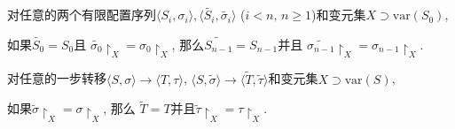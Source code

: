 \documentclass[UTF8]{ctexart}
\begin{document}
对任意的两个有限配置序列$\langle S_i,\sigma_i\rangle,
\langle\widetilde{S_i},\widetilde{\sigma_i}\rangle$
($i<n,\,n\geqslant 1$)和变元集$X\supset\mathrm{var}(S_0)$,

\vspace{1pt}
如果$\widetilde{S_0}=S_0$且
$\widetilde{\sigma_0}\!\restriction_X=\sigma_0\!\restriction_X$,
那么$\widetilde{S_{n-1}}=S_{n-1}$并且
$\widetilde{\sigma_{n-1}}\!\restriction_X=\sigma_{n-1}\!\restriction_X$.


\vspace{1pt}\hspace{-1em}
对任意的一步转移$\langle S,\sigma\rangle\to\langle T,\tau\rangle$,
$\langle S,\widetilde{\sigma}\rangle\to
\langle\widetilde{T},\widetilde{\tau}\rangle$和变元集$X\supset\mathrm{var}(S)$,

\vspace{1pt}\hspace{2.17em}
如果$\widetilde{\sigma}\!\restriction_X=\sigma\!\restriction_X$, 那么
$\widetilde{T}=T$并且$\widetilde{\tau}\!\restriction_X=\tau\!\restriction_X$.

\vspace{3pt}
\end{document}
